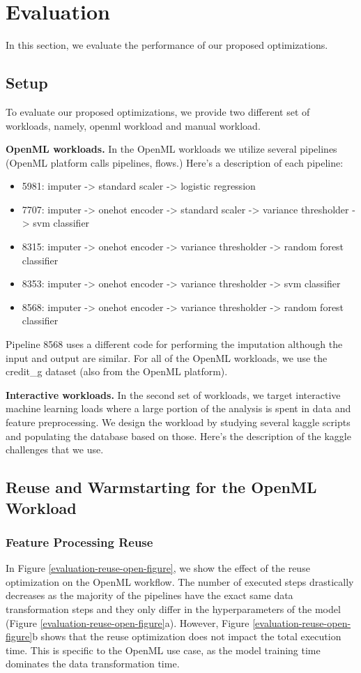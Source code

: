 \section{Evaluation} \label{sec-evaluation} 
In this section, we evaluate the performance of our proposed optimizations.
\subsection{Setup}
To evaluate our proposed optimizations, we provide two different set of workloads, namely, openml workload and manual workload.

\textbf{OpenML workloads.} In the OpenML workloads we utilize several pipelines (OpenML platform calls pipelines, flows.)
Here's a description of each pipeline:
\begin{itemize}
\item 5981: imputer -> standard scaler -> logistic regression
\item 7707: imputer -> onehot encoder -> standard scaler -> variance thresholder -> svm classifier
\item 8315: imputer -> onehot encoder -> variance thresholder -> random forest classifier
\item 8353: imputer -> onehot encoder -> variance thresholder -> svm classifier
\item 8568: imputer -> onehot encoder -> variance thresholder -> random forest classifier
\end{itemize}
Pipeline 8568 uses a different code for performing the imputation although the input and output are similar.
For all of the OpenML workloads, we use the credit\_g dataset (also from the OpenML platform).

\textbf{Interactive workloads.} In the second set of workloads, we target interactive machine learning loads where a large portion of the analysis is spent in data and feature preprocessing.
We design the workload by studying several kaggle scripts and populating the database based on those.
Here's the description of the kaggle challenges that we use.


\subsection{Reuse and Warmstarting for the OpenML Workload}
\subsubsection{Feature Processing Reuse}  
In Figure \ref{evaluation-reuse-open-figure}, we show the effect of the reuse optimization on the OpenML workflow.
The number of executed steps drastically decreases as the majority of the pipelines have the exact same data transformation steps and they only differ in the hyperparameters of the model (Figure \ref{evaluation-reuse-open-figure}a).
However, Figure \ref{evaluation-reuse-open-figure}b shows that the reuse optimization does not impact the total execution time.
This is specific to the OpenML use case, as the model training time dominates the data transformation time.

